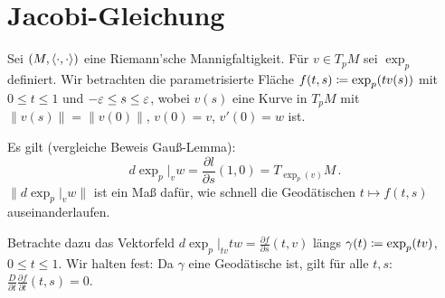 \documentclass[a4paper,twoside,DIV15,BCOR12mm]{scrbook}
\begin{document}
\section{Jacobi-Gleichung}

Sei $(M,\langle\cdot,\cdot\rangle)$ eine Riemann’sche Mannigfaltigkeit. Für $v\in T_pM$ sei $\exp_p$ definiert. Wir betrachten die parametrisierte Fläche $f(t,s) \da \exp_p(t v(s))$ mit $0\le t \le 1$ und $-\varepsilon \le s \le \varepsilon$, wobei $v(s)$ eine Kurve in $T_pM$ mit $\|v(s)\| = \|v(0)\|$, $v(0) = v$, $v'(0) = w$ ist.

Es gilt (vergleiche Beweis Gauß-Lemma):
\[
d\exp_p|_v w  = \frac{\partial l}{\partial s}(1,0) = T_{\exp_p(v)}M\,.
\] $\|d\exp_p|_v w\|$ ist ein Maß dafür, wie schnell die Geodätischen $t\mapsto f(t,s)$ auseinanderlaufen.


Betrachte dazu das Vektorfeld $d\exp_p|_{tv} tw = \frac{\partial f}{\partial s}(t,v)$ längs $\gamma(t) \da \exp_p(tv)$, $0\le t\le 1$. Wir halten fest: Da $\gamma$ eine Geodätische ist, gilt für alle $t,s$: $\frac D{\partial t}\frac{\partial f}{\partial t}(t,s)=0$.
\end{document}
